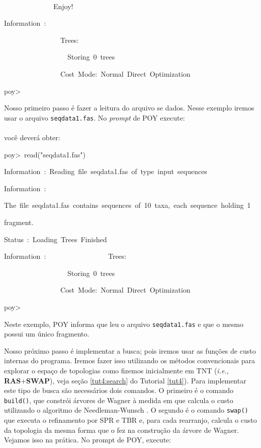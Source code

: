 \begin{refsection}
~~~~~~~~~~~~~~

~~~~~~~~~~~~~~Enjoy!

Information~:~

~~~~~~~~~~~~~~~~Trees:

~~~~~~~~~~~~~~~~~~Storing~0~trees~

~~~~~~~~~~~~~~~~Cost~Mode:~Normal~Direct~Optimization

poy>

\normalsize
\vspace{10pt}
Nosso primeiro passo é fazer a leitura do arquivo se dados. Nesse exemplo iremos usar o arquivo \texttt{seqdata1.fas}. No \textit{prompt} de POY execute:\\

\\

você deverá obter:\\

\scriptsize

poy>~read("seqdata1.fas")

Information~:~Reading~file~seqdata1.fas~of~type~input~sequences

Information~:

The~file~seqdata1.fas~contains~sequences~of~10~taxa,~each~sequence~holding~1

fragment.

Status~:~Loading~Trees~Finished

Information~:~
~~~~~~~~~~~~~~~~Trees:

~~~~~~~~~~~~~~~~~~Storing~0~trees~

~~~~~~~~~~~~~~~~Cost~Mode:~Normal~Direct~Optimization

poy>~
\vspace{10pt}
\normalsize

Neste exemplo, POY informa que leu o arquivo \texttt{seqdata1.fas} e que o mesmo possui um único fragmento.

Nosso próximo passo é implementar a busca; pois iremos usar as funções de custo internas do programa. Iremos fazer isso utilizando os métodos convencionais para explorar o espaço de topologias como fizemos inicialmente em TNT (\textit{i.e.}, \textbf{RAS}+\textbf{SWAP}), veja seção \ref{tut4:search} do Tutorial \ref{tut4}). Para implementar este tipo de busca são necessários dois comandos. O primeiro é o comando \texttt{build()}, que constrói árvores de Wagner à medida em que calcula o custo utilizando o algoritmo de Needleman-Wunsch \parencite{Needleman_and_Wunsch_1970}. O segundo é o comando \texttt{swap()} que executa o refinamento por SPR e TBR e, para cada rearranjo, calcula o custo da topologia da mesma forma que o fez na construção da árvore de Wagner. Vejamos isso na prática. No prompt de POY, execute:\\


\end{refsection}
